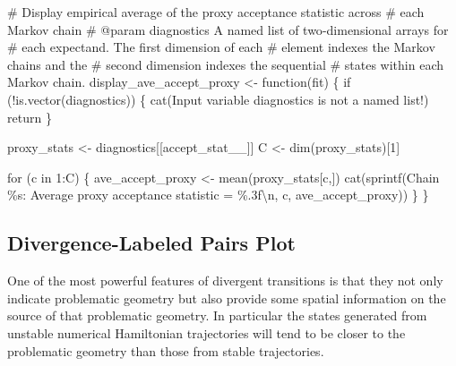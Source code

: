 \documentclass[
  letterpaper,
  DIV=11,
  numbers=noendperiod]{scrartcl}
\newenvironment{Shaded}{\begin{snugshade}}{\end{snugshade}}
\newcommand{\CommentTok}[1]{\textcolor[rgb]{0.37,0.37,0.37}{#1}}
\newcommand{\ControlFlowTok}[1]{\textcolor[rgb]{0.00,0.23,0.31}{#1}}
\newcommand{\DecValTok}[1]{\textcolor[rgb]{0.68,0.00,0.00}{#1}}
\newcommand{\FunctionTok}[1]{\textcolor[rgb]{0.28,0.35,0.67}{#1}}
\newcommand{\NormalTok}[1]{\textcolor[rgb]{0.00,0.23,0.31}{#1}}
\newcommand{\OtherTok}[1]{\textcolor[rgb]{0.00,0.23,0.31}{#1}}
\newcommand{\SpecialCharTok}[1]{\textcolor[rgb]{0.37,0.37,0.37}{#1}}
\newcommand{\StringTok}[1]{\textcolor[rgb]{0.13,0.47,0.30}{#1}}
\begin{document}
\begin{Shaded}
\begin{Highlighting}[]
\CommentTok{\# Display empirical average of the proxy acceptance statistic across }
\CommentTok{\# each Markov chain}
\CommentTok{\# @param diagnostics A named list of two{-}dimensional arrays for }
\CommentTok{\#                    each expectand.  The first dimension of each}
\CommentTok{\#                    element indexes the Markov chains and the }
\CommentTok{\#                    second dimension indexes the sequential }
\CommentTok{\#                    states within each Markov chain.}
\NormalTok{display\_ave\_accept\_proxy }\OtherTok{\textless{}{-}} \ControlFlowTok{function}\NormalTok{(fit) \{}
  \ControlFlowTok{if}\NormalTok{ (}\SpecialCharTok{!}\FunctionTok{is.vector}\NormalTok{(diagnostics)) \{}
    \FunctionTok{cat}\NormalTok{(}\StringTok{\textquotesingle{}Input variable \textasciigrave{}diagnostics\textasciigrave{} is not a named list!\textquotesingle{}}\NormalTok{)}
\NormalTok{    return}
\NormalTok{  \}}
  
\NormalTok{  proxy\_stats }\OtherTok{\textless{}{-}}\NormalTok{ diagnostics[[}\StringTok{\textquotesingle{}accept\_stat\_\_\textquotesingle{}}\NormalTok{]]}
\NormalTok{  C }\OtherTok{\textless{}{-}} \FunctionTok{dim}\NormalTok{(proxy\_stats)[}\DecValTok{1}\NormalTok{]}

  \ControlFlowTok{for}\NormalTok{ (c }\ControlFlowTok{in} \DecValTok{1}\SpecialCharTok{:}\NormalTok{C) \{}
\NormalTok{    ave\_accept\_proxy }\OtherTok{\textless{}{-}} \FunctionTok{mean}\NormalTok{(proxy\_stats[c,])}
    \FunctionTok{cat}\NormalTok{(}\FunctionTok{sprintf}\NormalTok{(}\StringTok{\textquotesingle{}Chain \%s: Average proxy acceptance statistic = \%.3f}\SpecialCharTok{\textbackslash{}n}\StringTok{\textquotesingle{}}\NormalTok{,}
\NormalTok{                c, ave\_accept\_proxy))}
\NormalTok{  \}}
\NormalTok{\}}
\end{Highlighting}
\end{Shaded}

\hypertarget{divergence-labeled-pairs-plot}{%
\subsection{Divergence-Labeled Pairs
Plot}\label{divergence-labeled-pairs-plot}}

One of the most powerful features of divergent transitions is that they
not only indicate problematic geometry but also provide some spatial
information on the source of that problematic geometry. In particular
the states generated from unstable numerical Hamiltonian trajectories
will tend to be closer to the problematic geometry than those from
stable trajectories.
\end{document}
